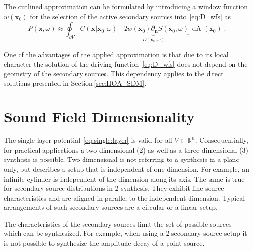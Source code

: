 \documentclass[a4paper]{book}
\newcommand{\reproduce}[1]{%
    \href{#1}{\color{link}\large\Pointinghand}%
}%
\newcommand{\D}[1]{\mathop{\mathrm{d}{#1}}}          %
\renewcommand{\vec}[1]{\mathbf{#1}}                  %
\newcommand{\x}{\vec{x}}                             %
\newcommand{\xs}{\x_\text{s}}                        %
\newcommand{\xref}{\x_\text{ref}}                    %
\newcommand{\n}{\vec{n}}                             %
\newcommand{\R}{\mathbb{R}}                          %
\newcommand{\qp}{\;.}                                             %
\def \twoD {{2\text{D}}\xspace}                                   %
\def \threeD {{3\text{D}}\xspace}                                 %
\begin{document}
{%
%    

The outlined approximation can be formulated by
introducing a window function $w(\x_0)$ for the selection of the active
secondary sources into~\eqref{eq:D_wfs} as
%
\begin{equation}
    P(\x,\omega) \approx \oint_{\partial V} \!\!  G(\x|\x_0,\omega) \,
    \underbrace{-2 w(\x_0) \partial_\n S(\x_0,\omega)}_{D(\x_0,\omega)} \; \D
    A(\x_0) \qp
    \label{eq:P_wfs}
\end{equation}
%

One of the advantages of the applied approximation is that due to its local
character the solution of the driving function~\eqref{eq:D_wfs} does not depend on
the geometry of the secondary sources. This dependency applies to the direct
solutions presented in Section\,\ref{sec:HOA_SDM}.


\section{Sound Field Dimensionality}
\label{sec:sound_field_dimensionality}
%
The single-layer potential~\eqref{eq:single:layer} is valid for all $V
\subset \R^n$. Consequentially, for practical applications a two-dimensional
(\twoD) as well as a three-dimensional (\threeD) synthesis is possible.
Two-dimensional is not referring to a synthesis in a plane only, but describes a setup
that is independent of one dimension. For example, an infinite cylinder is
independent of the dimension along its axis. The same is true
for secondary source distributions in \twoD synthesis. They exhibit
line source characteristics and are aligned in parallel to
the independent dimension. Typical arrangements of such secondary sources are
a circular or a linear setup.

The characteristics of the secondary
sources limit the set of possible sources which can be synthesized. For example,
when using a \twoD secondary source setup it is not possible to synthesize the
amplitude decay of a point source.

}
\end{document}
